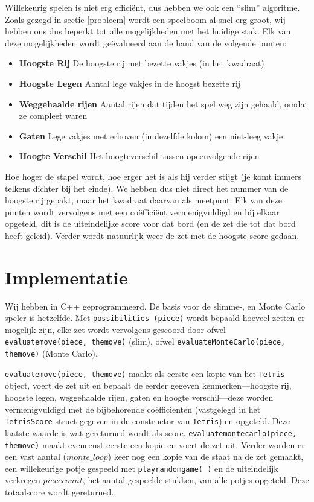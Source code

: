 \documentclass[10pt]{article}
\begin{document}
Willekeurig spelen is niet erg effici\"{e}nt, dus hebben we ook een ``slim'' algoritme. Zoals gezegd in sectie \ref{probleem} wordt een speelboom al snel erg groot, wij hebben ons dus beperkt tot alle mogelijkheden met het huidige stuk. Elk van deze mogelijkheden wordt ge\"{e}valueerd aan de hand van de volgende punten:
\begin{itemize}

\item \textbf{Hoogste Rij} De hoogste rij met bezette vakjes (in het kwadraat)

\item \textbf{Hoogste Legen} Aantal lege vakjes in de hoogst bezette rij

\item \textbf{Weggehaalde rijen} Aantal rijen dat tijden het spel weg zijn gehaald, omdat ze compleet waren

\item \textbf{Gaten} Lege vakjes met erboven (in dezelfde kolom) een niet-leeg vakje

\item \textbf{Hoogte Verschil} Het hoogteverschil tussen opeenvolgende rijen

\end{itemize}
Hoe hoger de stapel wordt, hoe erger het is als hij verder stijgt (je komt immers telkens dichter bij het einde). We hebben dus niet direct het nummer van de hoogste rij gepakt, maar het kwadraat daarvan als meetpunt. Elk van deze punten wordt vervolgens met een co\"effici\"ent vermenigvuldigd en bij elkaar opgeteld, dit is de uiteindelijke score voor dat bord (en de zet die tot dat bord heeft geleid). Verder wordt natuurlijk weer de zet met de hoogste score gedaan.

\section{Implementatie}

Wij hebben in C++ geprogrammeerd. De basis voor de slimme-, en Monte Carlo speler is hetzelfde. Met \verb+possibilities (piece)+ wordt bepaald hoeveel zetten er mogelijk zijn, elke zet wordt vervolgens gescoord door ofwel \verb+evaluatemove(piece, themove)+ (slim), ofwel \verb+evaluateMonteCarlo(piece, themove)+ (Monte Carlo).

\verb+evaluatemove(piece, themove)+ maakt als eerste een kopie van het \verb+Tetris+ object, voert de zet uit en bepaalt de eerder gegeven kenmerken---hoogste rij, hoogste legen, weggehaalde rijen, gaten en hoogte verschil---deze worden vermenigvuldigd met de bijbehorende co\"{e}fficienten (vastgelegd in het \verb+TetrisScore+ struct gegeven in de constructor van \verb+Tetris+) en opgeteld. Deze laatste waarde is wat gereturned wordt als score.
\verb+evaluatemontecarlo(piece, themove)+ maakt eveneenst eerste een kopie en voert de zet uit. Verder worden er een vast aantal ($monte\_loop$) keer nog een kopie van de staat na de zet gemaakt, een willekeurige potje gespeeld met \verb+playrandomgame( )+ en de uiteindelijk verkregen $piececount$, het aantal gespeelde stukken, van alle potjes opgeteld. Deze totaalscore wordt gereturned.
\end{document}
